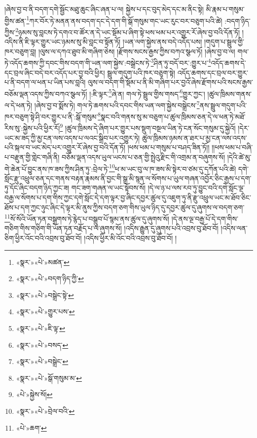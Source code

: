 །ཞེས་བྱ་བ་ནི་བདག་དགེ་སྦྱོང་མཐུ་ཆུང་ཞིང་ཞན་པ་ལ། སྐྱེས་པ་དང་བུད་མེད་དང་མ་ནིང་སྟེ། མི་རྣམ་པ་གསུམ་གྱིས་ཚན་\footnote{«སྣར་»«པེ་»མཚན་}ཀར་བོར་ཏེ་མནན་ནས་བདག་དང་དེ་དག་གི་སྒོ་གསུམ་གང་ཡང་རུང་བར་བཅུག་པའི་ཚེ། :བདག་ཉིད་ཀྱིས་\footnote{«སྣར་»«པེ་»བདག་ཉིད་ཀྱི་}ཉམས་སུ་བླངས་ཏེ་དགའ་བ་ཚོར་ན་དེ་ཡང་སྡོམ་པ་ཞིག་སྟེ་ཕས་ཕམ་པར་འགྱུར་རོ་ཞེས་བྱ་བའི་དོན་ཏོ། །འདིས་ནི་ཇི་ལྟར་གྱུར་ཡང་ཉམས་སུ་མི་བླང་བ་སྟོན་ཏོ། །ཡན་ལག་སྐྱེས་ནས་བདེ་འདོད་པས། །གདུག་པ་སྦྲུལ་གྱི་ཁར་བཅུག་བླ། །ལུས་ལ་དཀའ་ཐུབ་མི་གཞིག་ཅེས། །རྫོགས་སངས་རྒྱས་ཀྱིས་བཀའ་སྩལ་ཏོ། །ཞེས་བྱ་བ་ལ། གལ་ཏེ་འདོད་ཆགས་ཀྱི་དབང་གིས་བདག་གི་ཡན་ལག་སྐྱེས་:བསྒྲེངས་ཏེ་\footnote{«སྣར་»«པེ་»བསྒྲེང་སྟེ་}ཤིན་ཏུ་བདོ་བར་:གྱུར་པ་\footnote{«སྣར་»«པེ་»གྱུར་པས་}འདོད་ཆགས་དེ་དང་བྲལ་ཞིང་བདེ་བར་འདོད་པར་བྱ་བའི་ཕྱིར། སྦྲུལ་གདུག་པའི་ཁར་བཅུག་སྟེ། འདོད་ཆགས་དང་བྲལ་བར་གྱུར་པ་ནི་བདག་ལ་ཕན་པ་ཡིན་པས་བླའི། ལུས་ལ་བདག་གི་སྡོམ་པ་ནི་མི་གཞིག་པར་བྱའོ་ཞེས་རྫོགས་པའི་སངས་རྒྱས་བཅོམ་ལྡན་འདས་ཀྱིས་བཀའ་སྩལ་ཏོ། །:ཇི་ལྟར་\footnote{«སྣར་»«པེ་»ཇི་ལྟ་}ཞེ་ན། གལ་ཏེ་སྦྲུལ་གྱིས་གསད་\footnote{«སྣར་»«པེ་»བསད་}གྱུར་ཀྱང་། །ཚུལ་ཁྲིམས་གནས་ལ་དེ་ཕན་ཏེ། །ཞེས་བྱ་བ་སྨོས་ཏེ། གལ་ཏེ་ཆགས་པའི་དབང་གིས་ཡན་ལག་སྐྱེས་བསྒྲེངས་\footnote{«སྣར་»«པེ་»བསྒྲེང་}ནས་སྦྲུལ་གདུག་པའི་ཁར་བཅུག་སྟེ་ཤི་བར་གྱུར་པ་ནི་:སྒོ་གསུམ་\footnote{«སྣར་»«པེ་»སྒོ་གསུམ་མ་}སྣང་བའི་གནས་སུ་མ་བཅུག་པ་ཚུལ་ཁྲིམས་ཅན་དེ་ལ་ཕན་ཏེ་མཐོ་རིས་སུ་:སྐྱེས་པའི་ཕྱིར་རོ།\footnote{«པེ་»སྐྱེས་སོ།} །ཚུལ་ཁྲིམས་དེ་ཞིག་པར་གྱུར་པས་སྡུག་བསྔལ་ཡིན་ཏེ་ངན་སོང་གསུམ་དུ་སྐྱེའོ། །དེར་ཡང་མ་ཟད་ཀྱི་མྱ་ངན་ལས་འདས་པ་ལའང་སྒྲིབ་པར་འགྱུར་ཏེ། ཚུལ་ཁྲིམས་ཉམས་ན་ཐར་པ་མྱ་ངན་ལས་འདས་པའི་སྐལ་བ་ཡང་མེད་པར་འགྱུར་རོ་ཞེས་བྱ་བའི་དོན་ཏོ། །ཕས་ཕམ་པ་གསུམ་པ་བཤད་ཟིན་ཏོ།། །།ཕས་ཕམ་པ་བཞི་པ་བརྫུན་གྱི་གླེང་གཞི་ནི། བཅོམ་ལྡན་འདས་ཡུལ་ཡངས་པ་ཅན་གྱི་སྤྲེའུ་རྫིང་གི་འགྲམ་ན་བཞུགས་སོ། །དེའི་ཚེ་མུ་གེ་ཆེན་པོ་བྱུང་ནས་ཁ་ཟས་ཀྱིས་ཤིན་ཏུ་:བྲེལ་ཏེ་\footnote{«སྣར་»«པེ་»བྲེལ་བའི་}ཕ་མ་ཡང་བུ་ལ་ཁ་ཟས་མི་སྟེར་བ་ཙམ་དུ་དཀོན་པའི་ཚེ། དགེ་སློང་རྫུ་འཕྲུལ་ཅན་དང་གནས་བརྟན་རྣམས་ནི་བྱང་གི་སྒྲ་མི་སྙན་ལ་སོགས་པ་ཡུལ་གཞན་འབྱོར་ཅིང་རྒྱས་པ་དག་ཏུ་དོང་ཞིང་བདག་ཉིད་ཀྱང་ཟ། གང་ཟག་གཞན་ལ་ཡང་སྟོབས་སོ། །དེ་ལ་ཉ་པ་ལས་རབ་ཏུ་བྱུང་བའི་དགེ་སློང་ལྔ་བརྒྱ་ལ་སོགས་པ་དག་གིས་ཀྱང་དགེ་སློང་དེ་དག་ལྟར་བྱ་ཞིང་དབྱར་ཚུལ་དུ་འཇུག་ཏུ་ནི་རྫུ་འཕྲུལ་ཡང་མ་ཐོབ་ཅིང་ཐོས་པ་དག་ཀྱང་ཉུང་ཞིང་དེ་ལྟར་མི་ནུས་ཀྱིས་བདག་ཅག་གིས་ཡུལ་ཉིད་དུ་དབྱར་ཚུལ་དུ་ཞུགས་ལ་བདག་ཅག་\footnote{«པེ་»ཆག་}སོ་སོའི་ཡོན་ཏན་བསྒྲགས་ཏེ་རྙེད་པ་བསྒྲུབ་པོ་སྙམ་ནས་ཚུལ་དུ་ཞུགས་སོ། །དེ་ནས་ལྔ་བརྒྱ་པོ་དེ་དག་གིས་གཅིག་གིས་གཅིག་གི་ཡོན་ཏན་བརྗོད་པ་ལ་ཞུགས་སོ། །འདིས་རྒྱུན་དུ་ཞུགས་པའི་འབྲས་བུ་ཐོབ་བོ། །འདིས་ལན་ཅིག་ཕྱིར་འོང་བའི་འབྲས་བུ་ཐོབ་བོ། །འདིས་ཕྱིར་མི་འོང་བའི་འབྲས་བུ་ཐོབ་བོ། །
